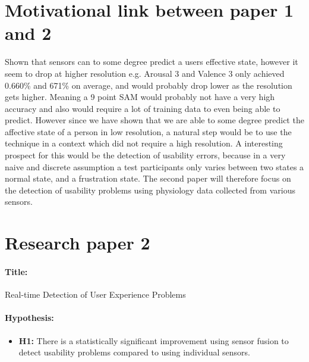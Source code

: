 
\section{Motivational link between paper 1 and 2}
Shown that sensors can to some degree predict a users effective state, however it seem to drop at higher resolution e.g. Arousal 3 and Valence 3 only achieved 0.660\% and 671\% on average, and would probably drop lower as the resolution gets higher. Meaning a 9 point SAM would probably not have a very high accuracy and also would require a lot of training data to even being able to predict.
However since we have shown that we are able to some degree predict the affective state of a person in low resolution, a natural step would be to use the technique in a context which did not require a high resolution. 
A interesting prospect for this would be the detection of usability errors, because in a very naive and discrete assumption a test participants only varies between two states a normal state, and a frustration state.
The second paper will therefore focus on the detection of usability problems using physiology data collected from various sensors.

\section{Research paper 2}
\paragraph{Title:}
Real-time Detection of User Experience Problems
\paragraph{Hypothesis:}
\begin{itemize}
    \item \textbf{H1:} There is a statistically significant improvement using sensor fusion to detect usability problems compared to using individual sensors.
\end{itemize}

